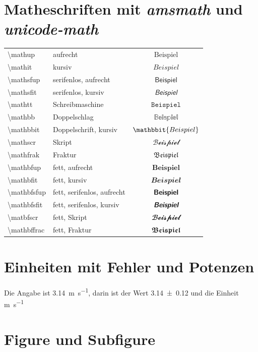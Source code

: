 \section{Matheschriften mit \emph{amsmath} und \emph{unicode-math}}
\begin{table}
\begin{tabular}{llc}
	\backslash mathup		& aufrecht					& $\mathup{Beispiel}$ \\
	\backslash mathit		& kursiv					& $\mathit{Beispiel}$ \\
	\backslash mathsfup		& serifenlos, aufrecht		& $\mathsfup{Beispiel}$ \\
	\backslash 	mathsfit	& serifenlos, kursiv		& $\mathsfit{Beispiel}$ \\
	\backslash 	mathtt		& Schreibmaschine			& $\mathtt{Beispiel}$ \\
	\backslash 	mathbb		& Doppelschlag				& $\mathbb{Beispiel}$ \\
	\backslash 	mathbbit	& Doppelschrift, kursiv		& $\mathbbit{Beispiel}$ \\
	\backslash 	mathscr		& Skript					& $\mathscr{Beispiel}$ \\
	\backslash 	mathfrak	& Fraktur					& $\mathfrak{Beispiel}$ \\
	\backslash mathbfup		& fett, aufrecht			& $\mathbfup{Beispiel}$ \\
	\backslash mathbfit		& fett, kursiv				& $\mathbfit{Beispiel}$ \\
	\backslash 	mathbfsfup	& fett, serifenlos, aufrecht& $\mathbfsfup{Beispiel}$ \\
	\backslash 	mathbfsfit	& fett, serifenlos, kursiv	& $\mathbfsfit{Beispiel}$ \\
	\backslash 	matbfscr	& fett, Skript				& $\mathbfscr{Beispiel}$ \\
	\backslash 	mathbffrac	& fett, Fraktur				& $\mathbffrak{Beispiel}$ 
\end{tabular}
\end{table}

\section{Einheiten mit Fehler und Potenzen}

Die Angabe ist \SI{3.14}{\meter\per\second},
darin ist 
der Wert \num{3.14 +- 0.12}%
und
die Einheit \si{\meter\per\second}


\section{Figure und Subfigure}

